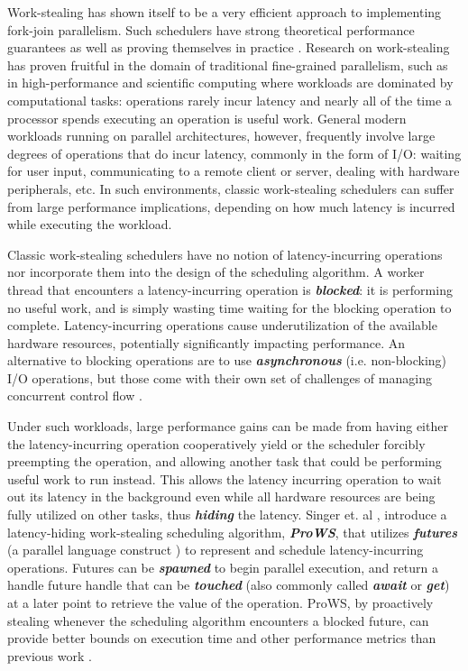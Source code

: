 \documentclass[bsc,frontabs,singlespacing,parskip,deptreport,normalheadings]{infthesis}
\begin{document}
Work-stealing has shown itself to be a very efficient approach to implementing
fork-join parallelism. Such schedulers have strong theoretical performance
guarantees \cite{blumofe_scheduling_1999} as well as proving themselves in
practice \cite{arora_thread_1998}. Research on work-stealing has proven fruitful
in the domain of traditional fine-grained parallelism, such as in
high-performance and scientific computing where workloads are dominated by
computational tasks: operations rarely incur latency and nearly all of the time
a processor spends executing an operation is useful work. General modern
workloads running on parallel architectures, however, frequently involve large
degrees of operations that do incur latency, commonly in the form of I/O:
waiting for user input, communicating to a remote client or server, dealing with
hardware peripherals, etc. In such environments, classic work-stealing
schedulers can suffer from large performance implications, depending on how much
latency is incurred while executing the workload.

Classic work-stealing schedulers have no notion of latency-incurring operations
nor incorporate them into the design of the scheduling algorithm. A worker
thread that encounters a latency-incurring operation is
\textbf{\textit{blocked}}: it is performing no useful work, and is simply
wasting time waiting for the blocking operation to complete. Latency-incurring
operations cause underutilization of the available hardware resources,
potentially significantly impacting performance. An alternative to blocking
operations are to use \textbf{\textit{asynchronous}} (i.e. non-blocking) I/O
operations, but those come with their own set of challenges of managing
concurrent control flow \cite{niebler_structured_2020, smith_notes_nodate}.

Under such workloads, large performance gains can be made from having either the
latency-incurring operation cooperatively yield or the scheduler forcibly
preempting the operation, and allowing another task that could be performing
useful work to run instead. This allows the latency incurring operation to wait
out its latency in the background even while all hardware resources are being
fully utilized on other tasks, thus \textbf{\textit{hiding}} the latency. Singer
et. al \cite{singer_proactive_2019}, introduce a latency-hiding work-stealing
scheduling algorithm, \textit{\textbf{ProWS}}, that utilizes
\textbf{\textit{futures}} (a parallel language construct
\cite{halstead_implementation_1984, halstead_multilisp_1985}) to represent and
schedule latency-incurring operations. Futures can be \textbf{\textit{spawned}}
to begin parallel execution, and return a handle future handle that can be
\textbf{\textit{touched}} (also commonly called \textbf{\textit{await}} or
\textbf{\textit{get}}) at a later point to retrieve the value of the operation.
ProWS, by proactively stealing whenever the scheduling algorithm encounters a
blocked future, can provide better bounds on execution time and other
performance metrics than previous work \cite{muller_latency-hiding_2016,
spoonhower_beyond_2009}.
\end{document}
